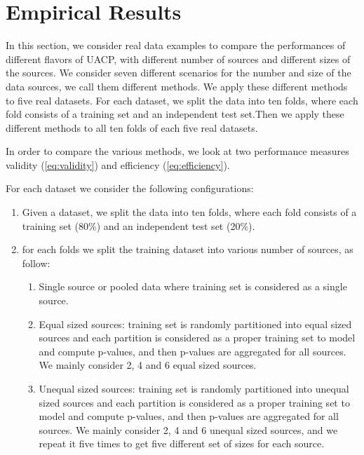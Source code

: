 \documentclass[main]{subfiles}
\begin{document}
\section{Empirical Results}\label{sec:results}
In this section, we consider real data examples to compare the performances of different flavors of UACP, with different number of sources and different sizes of the sources. We consider seven different scenarios for the number and size of the data sources, we call them different methods.  We apply these different methods to five real datasets. For each dataset, we split the data into ten folds, where each fold consists of a training set and an independent test set.Then we apply these different methods to all ten folds of each five real datasets. 

In order to compare the various methods, we look at two performance measures validity (\ref{eq:validity}) and efficiency (\ref{eq:efficiency}). %

For each dataset we consider the following configurations:

\begin{enumerate}

\item Given a dataset, we split the data into ten folds, where each fold consists of a training set (80\%) and an independent test set (20\%).

\item for each folds we split the training dataset into various number of sources, as follow:
\begin{enumerate}
	\item Single source or pooled data  where training set is considered as a single source.
	\item Equal sized sources: training set is randomly partitioned into equal sized sources and  each partition is considered as a proper training set to model and compute p-values, and then p-values are aggregated for all sources. We mainly consider 2, 4 and 6 equal sized sources. %
	\item Unequal sized sources: training set is randomly partitioned into unequal sized sources and  each partition is considered as a proper training set to model and compute p-values, and then p-values are aggregated for all sources. We mainly consider 2, 4 and 6 unequal sized sources, and we repeat it five times to get five different set of sizes for each source.
\end{enumerate}

\end{enumerate}
\end{document}
